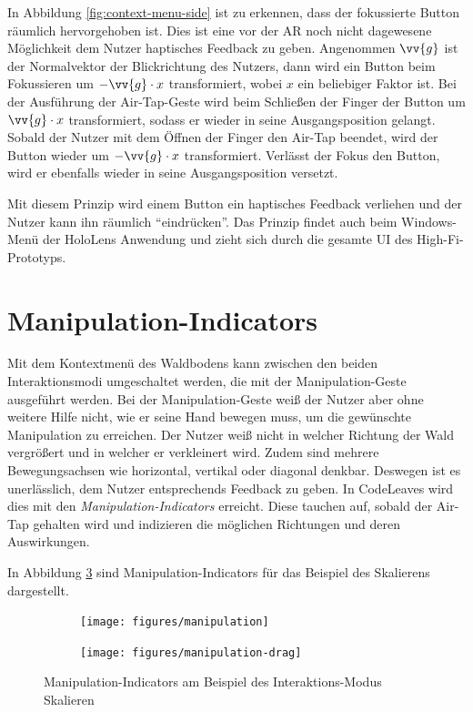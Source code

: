 In Abbildung \ref{fig:context-menu-side} ist zu erkennen, dass der fokussierte Button räumlich hervorgehoben ist. Dies ist eine vor der AR noch nicht dagewesene Möglichkeit dem Nutzer haptisches Feedback zu geben. Angenommen $\vv{g}$ ist der Normalvektor der Blickrichtung des Nutzers, dann wird ein Button beim Fokussieren um $-\vv{g} \cdot x$ transformiert, wobei $x$ ein beliebiger Faktor ist. Bei der Ausführung der Air-Tap-Geste wird beim Schließen der Finger der Button um $\vv{g} \cdot x$ transformiert, sodass er wieder in seine Ausgangsposition gelangt. Sobald der Nutzer mit dem Öffnen der Finger den Air-Tap beendet, wird der Button wieder um $-\vv{g} \cdot x$ transformiert. Verlässt der Fokus den Button, wird er ebenfalls wieder in seine Ausgangsposition versetzt.

Mit diesem Prinzip wird einem Button ein haptisches Feedback verliehen und der Nutzer kann ihn räumlich "`eindrücken"'. Das Prinzip findet auch beim Windows-Menü der HoloLens Anwendung und zieht sich durch die gesamte UI des High-Fi-Prototyps.

\section{Manipulation-Indicators}
\label{subsec:manipulation-indicators}
Mit dem Kontextmenü des Waldbodens kann zwischen den beiden Interaktionsmodi umgeschaltet werden, die mit der Manipulation-Geste ausgeführt werden. Bei der Manipulation-Geste weiß der Nutzer aber ohne weitere Hilfe nicht, wie er seine Hand bewegen muss, um die gewünschte Manipulation zu erreichen. Der Nutzer weiß nicht in welcher Richtung der Wald vergrößert und in welcher er verkleinert wird. Zudem sind mehrere Bewegungsachsen wie horizontal, vertikal oder diagonal denkbar. Deswegen ist es unerlässlich, dem Nutzer entsprechends Feedback zu geben. In CodeLeaves wird dies mit den \textit{Manipulation-Indicators} erreicht. Diese tauchen auf, sobald der Air-Tap gehalten wird und indizieren die möglichen Richtungen und deren Auswirkungen.

In Abbildung \ref{fig:manipulation} sind Manipulation-Indicators für das Beispiel des Skalierens dargestellt.

\begin{figure}[htb]
  \centering
  \begin{subfigure}[t]{\fwidth}
    \centering
    \texttt{[image: figures/manipulation]}
     \label{fig:manipulation}
  \end{subfigure}
  \begin{subfigure}[t]{\fwidth}
    \centering
  	\texttt{[image: figures/manipulation-drag]}
  	 \label{fig:manipulation-drag}
  \end{subfigure}
  \caption{Manipulation-Indicators am Beispiel des Interaktions-Modus Skalieren} \label{fig:manipulation}
\end{figure}

